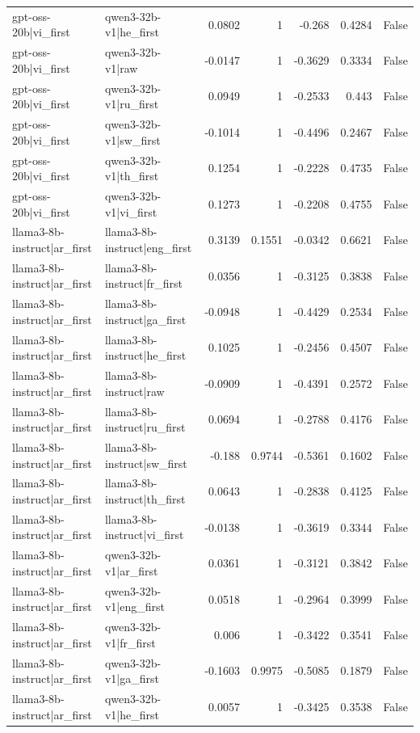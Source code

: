 \begin{table}
\begin{tabular}{l l r r r r l}
gpt-oss-20b|vi_first & qwen3-32b-v1|he_first & 0.0802 & 1 & -0.268 & 0.4284 & False \\
gpt-oss-20b|vi_first & qwen3-32b-v1|raw & -0.0147 & 1 & -0.3629 & 0.3334 & False \\
gpt-oss-20b|vi_first & qwen3-32b-v1|ru_first & 0.0949 & 1 & -0.2533 & 0.443 & False \\
gpt-oss-20b|vi_first & qwen3-32b-v1|sw_first & -0.1014 & 1 & -0.4496 & 0.2467 & False \\
gpt-oss-20b|vi_first & qwen3-32b-v1|th_first & 0.1254 & 1 & -0.2228 & 0.4735 & False \\
gpt-oss-20b|vi_first & qwen3-32b-v1|vi_first & 0.1273 & 1 & -0.2208 & 0.4755 & False \\
llama3-8b-instruct|ar_first & llama3-8b-instruct|eng_first & 0.3139 & 0.1551 & -0.0342 & 0.6621 & False \\
llama3-8b-instruct|ar_first & llama3-8b-instruct|fr_first & 0.0356 & 1 & -0.3125 & 0.3838 & False \\
llama3-8b-instruct|ar_first & llama3-8b-instruct|ga_first & -0.0948 & 1 & -0.4429 & 0.2534 & False \\
llama3-8b-instruct|ar_first & llama3-8b-instruct|he_first & 0.1025 & 1 & -0.2456 & 0.4507 & False \\
llama3-8b-instruct|ar_first & llama3-8b-instruct|raw & -0.0909 & 1 & -0.4391 & 0.2572 & False \\
llama3-8b-instruct|ar_first & llama3-8b-instruct|ru_first & 0.0694 & 1 & -0.2788 & 0.4176 & False \\
llama3-8b-instruct|ar_first & llama3-8b-instruct|sw_first & -0.188 & 0.9744 & -0.5361 & 0.1602 & False \\
llama3-8b-instruct|ar_first & llama3-8b-instruct|th_first & 0.0643 & 1 & -0.2838 & 0.4125 & False \\
llama3-8b-instruct|ar_first & llama3-8b-instruct|vi_first & -0.0138 & 1 & -0.3619 & 0.3344 & False \\
llama3-8b-instruct|ar_first & qwen3-32b-v1|ar_first & 0.0361 & 1 & -0.3121 & 0.3842 & False \\
llama3-8b-instruct|ar_first & qwen3-32b-v1|eng_first & 0.0518 & 1 & -0.2964 & 0.3999 & False \\
llama3-8b-instruct|ar_first & qwen3-32b-v1|fr_first & 0.006 & 1 & -0.3422 & 0.3541 & False \\
llama3-8b-instruct|ar_first & qwen3-32b-v1|ga_first & -0.1603 & 0.9975 & -0.5085 & 0.1879 & False \\
llama3-8b-instruct|ar_first & qwen3-32b-v1|he_first & 0.0057 & 1 & -0.3425 & 0.3538 & False \\

\end{tabular}
\end{table}
